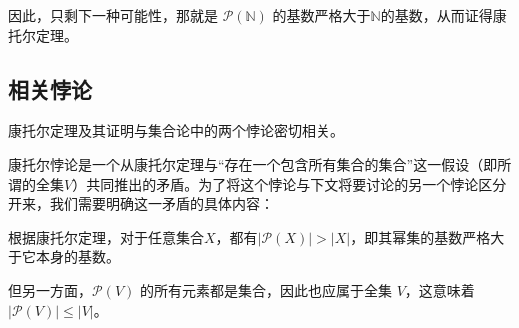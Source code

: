 因此，只剩下一种可能性，那就是 $\mathcal{P}(\mathbb{N})$ 的基数严格大于$\mathbb{N}$的基数，从而证得康托尔定理。
\subsection{相关悖论}
康托尔定理及其证明与集合论中的两个悖论密切相关。

康托尔悖论是一个从康托尔定理与“存在一个包含所有集合的集合”这一假设（即所谓的全集$V$）共同推出的矛盾。为了将这个悖论与下文将要讨论的另一个悖论区分开来，我们需要明确这一矛盾的具体内容：

根据康托尔定理，对于任意集合$X$，都有$|\mathcal{P}(X)| > |X|$，即其幂集的基数严格大于它本身的基数。

但另一方面，$\mathcal{P}(V)$ 的所有元素都是集合，因此也应属于全集 $V$，这意味着 $|\mathcal{P}(V)| \leq |V|$。

